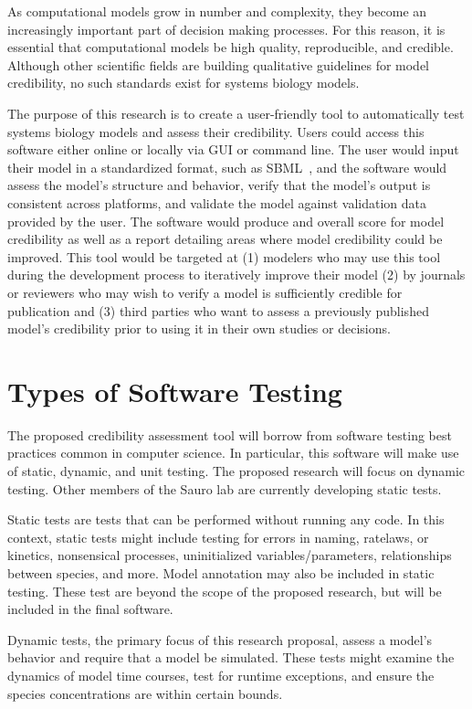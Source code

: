 \documentclass[12pt]{report}
\begin{document}
As computational models grow in number and complexity, they become an increasingly important part of decision making processes. For this reason, it is essential that computational models be high quality, reproducible, and credible. Although other scientific fields are building qualitative guidelines for model credibility, no such standards exist for systems biology models. 

The purpose of this research is to create a user-friendly tool to automatically test systems biology models and assess their credibility. Users could access this software either online or locally via GUI or command line.  The user would input their model in a standardized format, such as SBML~\cite{SBML}, and the software would assess the model's structure and behavior, verify that the model's output is consistent across platforms, and validate the model against validation data provided by the user. The software would produce and overall score for model credibility as well as a report detailing areas where model credibility could be improved. This tool would be targeted at (1) modelers who may use this tool during the development process to iteratively improve their model (2) by journals or reviewers who may wish to verify a model is sufficiently credible for publication and (3) third parties who want to assess a previously published model's credibility prior to using it in their own studies or decisions.  


\section{Types of Software Testing}
The proposed credibility assessment tool will borrow from software testing best practices common in computer science. 
In particular, this software will make use of static, dynamic, and unit testing. The proposed research will focus on dynamic testing. Other members of the Sauro lab are currently developing static tests.

Static tests are tests that can be performed without running any code. In this context, static tests might include testing for errors in naming, ratelaws, or kinetics, nonsensical processes, uninitialized variables/parameters, relationships between species, and more. Model annotation may also be included in static testing. These test are beyond the scope of the proposed research, but will be included in the final software. 

Dynamic tests, the primary focus of this research proposal, assess a model's behavior and require that a model be simulated. These tests might examine the dynamics of model time courses, test for runtime exceptions, and ensure the species concentrations are within certain bounds.
\end{document}
